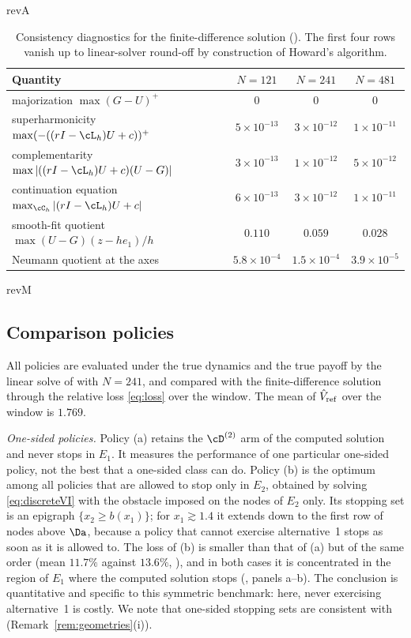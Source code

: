\begin{table}[htbp]
\begin{rv}{revA}{}
\centering\small
\caption{Consistency diagnostics for the finite-difference solution (). The
first four rows vanish up to linear-solver round-off by construction of Howard's
algorithm.}\label{tab:residuals}
\begin{tabular}{@{}lccc@{}}
\toprule
Quantity & $N=121$ & $N=241$ & $N=481$\\
\midrule
majorization $\max(G-U)^+$ & $0$ & $0$ & $0$\\
superharmonicity $\max(-((rI-\cL_h)U+c))^+$ & $5\times10^{-13}$ & $3\times10^{-12}$ & $1\times10^{-11}$\\
complementarity $\max|((rI-\cL_h)U+c)(U-G)|$ & $3\times10^{-13}$ & $1\times10^{-12}$ & $5\times10^{-12}$\\
continuation equation $\max_{\cC_h}|(rI-\cL_h)U+c|$ & $6\times10^{-13}$ & $3\times10^{-12}$ & $1\times10^{-11}$\\
smooth-fit quotient $\max(U-G)(z-he_1)/h$ & $0.110$ & $0.059$ & $0.028$\\
Neumann quotient at the axes & $5.8\times10^{-4}$ & $1.5\times10^{-4}$ & $3.9\times10^{-5}$\\
\bottomrule
\end{tabular}
\end{rv}
\end{table}

\begin{rv}{revM}{}
\subsection{Comparison policies}\label{sec:policies}

All policies are evaluated under the true dynamics and the true payoff by the linear solve of
 with $N=241$, and compared with the finite-difference solution through the relative
loss \eqref{eq:loss} over the window. The mean of $\hat V_{\rm ref}$ over the window is $1.769$.

\emph{One-sided policies.} Policy (a) retains the $\cD^{(2)}$ arm of the computed solution and never
stops in $E_1$. It measures the performance of one
particular one-sided policy, not the best that a one-sided class can do. Policy (b) is the optimum
among all policies that are allowed to stop only in $E_2$, obtained by solving
\eqref{eq:discreteVI} with the obstacle imposed on the nodes of $E_2$ only. Its stopping set is an
epigraph $\{x_2\ge b(x_1)\}$; for $x_1\gtrsim1.4$ it extends down to the first row of nodes above
$\Da$, because a policy that cannot exercise alternative~1 stops as soon as it is allowed to. The
loss of (b) is smaller than that of (a) but of the same order (mean $11.7\%$ against $13.6\%$,
), and in both cases it is concentrated in the region of $E_1$ where the computed
solution stops (, panels a--b). The conclusion is quantitative and specific to this
symmetric benchmark: here, never exercising alternative~1 is costly. We note that one-sided stopping sets are consistent with  (Remark~\ref{rem:geometries}(i)).
\end{rv}

